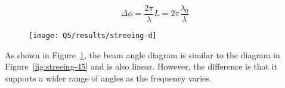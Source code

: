 \documentclass[12pt,onecolumn,a4paper]{article}
\begin{document}
	\begin{equation}
		\Delta\phi = \frac{2\pi}{\lambda}L = 2\pi \frac{\lambda_0}{\lambda}
	\end{equation}
	
	
	\begin{figure}[H]
		\centering
		\texttt{[image: Q5/results/streeing-d]}
		\caption{}
		\label{fig:streeing-d}
	\end{figure}
	
	As shown in Figure~\ref{fig:streeing-d}, the beam angle diagram is similar to the diagram in Figure~\ref{fig:streeing-45} and is also linear. However, the difference is that it supports a wider range of angles as the frequency varies.
	
	
	
	
	\newpage
	
	\nocite{*}
	
	
\end{document}
